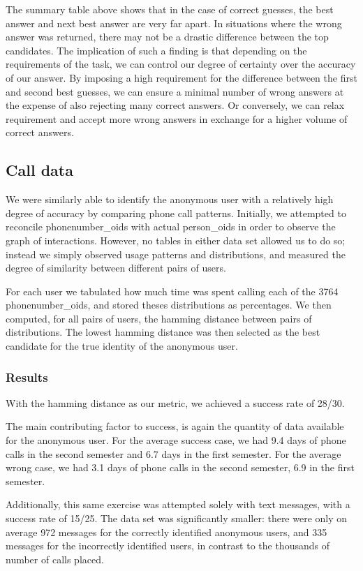 \documentclass[pageno]{jpaper}
\begin{document}
The summary table above shows that in the case of correct guesses, the best answer and next best answer are very far apart. In situations where the wrong answer was returned, there may not be a drastic difference between the top candidates. The implication of such a finding is that depending on the requirements of the task, we can control our degree of certainty over the accuracy of our answer. By imposing a high requirement for the difference between the first and second best guesses, we can ensure a minimal number of wrong answers at the expense of also rejecting many correct answers. Or conversely, we can relax requirement and accept more wrong answers in exchange for a higher volume of correct answers. 

\subsection{Call data}

We were similarly able to identify the anonymous user with a relatively high degree of accuracy by comparing phone call patterns. Initially, we attempted to reconcile phonenumber\_oids with actual person\_oids in order to observe the graph of interactions. However, no tables in either data set allowed us to do so; instead we simply observed usage patterns and distributions, and measured the degree of similarity between different pairs of users.

For each user we tabulated how much time was spent calling each of the 3764 phonenumber\_oids, and stored theses distributions as percentages. We then computed, for all pairs of users, the hamming distance between pairs of distributions. The lowest hamming distance was then selected as the best candidate for the true identity of the anonymous user. 

\subsubsection{Results}

With the hamming distance as our metric, we achieved a success rate of 28/30. 

The main contributing factor to success, is again the quantity of data available for the anonymous user. For the average success case, we had 9.4 days of phone calls in the second semester and 6.7 days in the first semester. For the average wrong case, we had 3.1 days of phone calls in the second semester, 6.9 in the first semester.

Additionally, this same exercise was attempted solely with text messages, with a success rate of 15/25. The data set was significantly smaller: there were only on average 972 messages for the correctly identified anonymous users, and 335 messages for the incorrectly identified users, in contrast to the thousands of number of calls placed.
\end{document}
